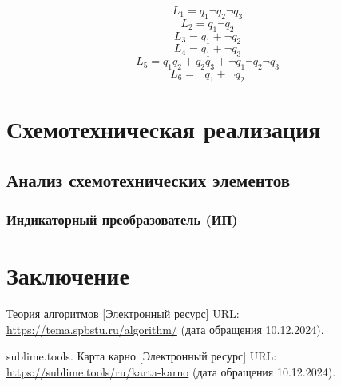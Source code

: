 \documentclass[a4paper, final]{article}
\begin{document}
\[L_1 = q_1 \neg q_2 \neg q_3\]
\[L_2 = q_1 \neg q_2\]
\[L_3 = q_1 + \neg q_2\]
\[L_4 = q_1 + \neg q_3\]
\[L_5 = q_1 q_2 + q_2 q_3 + \neg q_1 \neg q_2 \neg q_3\]
\[L_6 = \neg q_1 + \neg q_2\]

\newpage
\section{Схемотехническая реализация}
\subsection{Анализ схемотехнических элементов}
\subsubsection{Индикаторный преобразователь (ИП)}

\cleardoublepage
{}
\newpage
{}
\section*{Заключение}


\cleardoublepage
{}
\newpage
\begin{thebibliography}{0}
	Теория алгоритмов [Электронный ресурс] URL: \url{https://tema.spbstu.ru/algorithm/} (дата обращения 10.12.2024).

	sublime.tools. Карта карно [Электронный ресурс] URL: \url{https://sublime.tools/ru/karta-karno} (дата обращения 10.12.2024).
\end{thebibliography}
\end{document}
